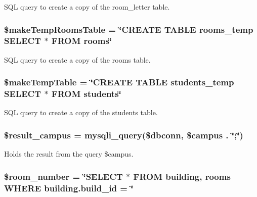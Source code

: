 \-S\-Q\-L query to create a copy of the room\-\_\-letter table. \hypertarget{manage_8php_ab664e3752ad88a1b92d5f9d505faa716}{
\subsubsection[{\$make\-Temp\-Rooms\-Table}]{\setlength{\rightskip}{0pt plus 5cm}\$make\-Temp\-Rooms\-Table = \char`\"{}\-C\-R\-E\-A\-T\-E \-T\-A\-B\-L\-E rooms\-\_\-temp \-S\-E\-L\-E\-C\-T $\ast$ \-F\-R\-O\-M rooms\char`\"{}}}\label{manage_8php_ab664e3752ad88a1b92d5f9d505faa716}
\-S\-Q\-L query to create a copy of the rooms table. \hypertarget{manage_8php_a0febbda45804f1928bcedee869cd7317}{
\subsubsection[{\$make\-Temp\-Table}]{\setlength{\rightskip}{0pt plus 5cm}\$make\-Temp\-Table = \char`\"{}\-C\-R\-E\-A\-T\-E \-T\-A\-B\-L\-E students\-\_\-temp \-S\-E\-L\-E\-C\-T $\ast$ \-F\-R\-O\-M students\char`\"{}}}\label{manage_8php_a0febbda45804f1928bcedee869cd7317}
\-S\-Q\-L query to create a copy of the students table. \hypertarget{manage_8php_afdd2ad9cb7726ebdf33d1095eac78a1a}{
\subsubsection[{\$result\-\_\-campus}]{\setlength{\rightskip}{0pt plus 5cm}\$result\-\_\-campus = mysqli\-\_\-query(\$dbconn, \$campus . \char`\"{};\char`\"{})}}\label{manage_8php_afdd2ad9cb7726ebdf33d1095eac78a1a}
\-Holds the result from the query \$campus. \hypertarget{manage_8php_a1f68a7fd1d38612fa4b61dda6e9bd035}{
\subsubsection[{\$room\-\_\-number}]{\setlength{\rightskip}{0pt plus 5cm}\$room\-\_\-number = \char`\"{}\-S\-E\-L\-E\-C\-T $\ast$ \-F\-R\-O\-M building, rooms \-W\-H\-E\-R\-E building.\-build\-\_\-id = \char`\"{}}}\label{manage_8php_a1f68a7fd1d38612fa4b61dda6e9bd035}
